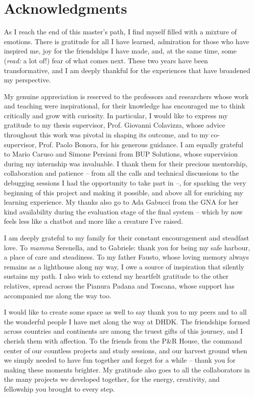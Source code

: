 \chapter{Acknowledgments}

\begin{spacing}{1.5}
As I reach the end of this master’s path, I find myself filled with a mixture of emotions. There is gratitude for all I have learned, admiration for those who have inspired me, joy for the friendships I have made, and, at the same time, some (\textit{read:} a lot of!) fear of what comes next. These two years have been transformative, and I am deeply thankful for the experiences that have broadened my perspective.

My genuine appreciation is reserved to the professors and researchers whose work and teaching were inspirational, for their knowledge has encouraged me to think critically and grow with curiosity. In particular, I would like to express my gratitude to my thesis supervisor, Prof. Giovanni Colavizza, whose advice throughout this work was pivotal in shaping its outcome, and to my co-supervisor, Prof. Paolo Bonora, for his generous guidance. I am equally grateful to Mario Caruso and Simone Persiani from BUP Solutions, whose supervision during my internship was invaluable. I thank them for their precious mentorship, collaboration and patience -- from all the calls and technical discussions to the debugging sessions I had the opportunity to take part in --, for sparking the very beginning of this project and making it possible, and above all for enriching my learning experience. My thanks also go to Ada Gabucci from the GNA for her kind availability during the evaluation stage of the final system -- which by now feels less like a chatbot and more like a creature I’ve raised.

I am deeply grateful to my family for their constant encouragement and steadfast love. To \textit{mamma} Serenella, and to Gabriele: thank you for being my safe harbour, a place of care and steadiness. To my father Fausto, whose loving memory always remains as a lighthouse along my way, I owe a source of inspiration that silently sustains my path. I also wish to extend my heartfelt gratitude to the other relatives, spread across the Pianura Padana and Toscana, whose support has accompanied me along the way too.

I would like to create some space as well to say thank you to my peers and to all the wonderful people I have met along the way at DHDK. The friendships formed across countries and continents are among the truest gifts of this journey, and I cherish them with affection. To the friends from the P\&R House, the command center of our countless projects and study sessions, and our harvest ground when we simply needed to have fun together and forget for a while -- thank you for making these moments brighter. My gratitude also goes to all the collaborators in the many projects we developed together, for the energy, creativity, and fellowship you brought to every step.


\end{spacing}
